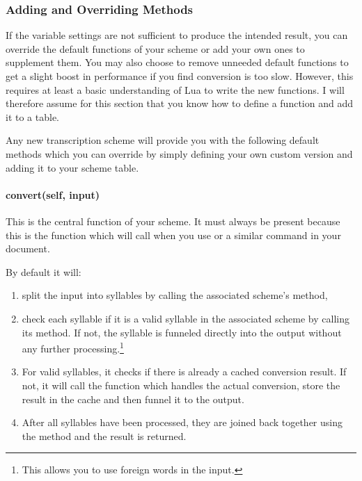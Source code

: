 \documentclass{ltxdockit}
\begin{document}
\subsubsection{Adding and Overriding Methods}

If the variable settings are not sufficient to produce the intended result, you
can override the default functions of your scheme or add your own ones to
supplement them. You may also choose to remove unneeded default functions to get
a slight boost in performance if you find conversion is too slow. However, this
requires at least a basic understanding of Lua to write the new functions. I
will therefore assume for this section that you know how to define a function
and add it to a table.


Any new transcription scheme will provide you with the following default methods
which you can override by simply defining your own custom version and adding it
to your scheme table.

\paragraph{convert(self, input)}

This is the central function of your scheme. It must always be present because
this is the function which  will call when you use
 or a similar command in your document.

By default it will:

\begin{enumerate}
  \item split the input into syllables by calling the associated 
    scheme's  method,
  \item check each syllable if it is a valid syllable in the associated
     scheme by calling its
     method. If not, the
    syllable is funneled directly into the output without any further
    processing.\footnote{This allows you to use foreign words in the input.}
  \item For valid syllables, it checks if there is already a cached conversion
    result. If not, it will call the
     function which
    handles the actual conversion, store the result in the cache and then funnel
    it to the output.
  \item After all syllables have been processed, they are joined back together
    using the  method and the result is returned.
\end{enumerate}
\end{document}
